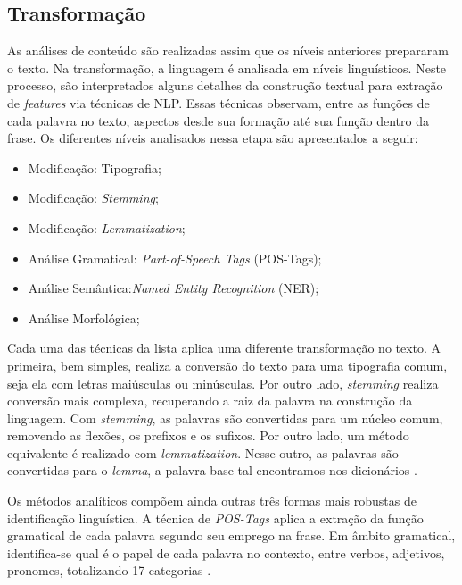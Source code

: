 \subsection{Transformação}
\label{subsec-transformacao}

As análises de conteúdo são realizadas assim que os níveis anteriores prepararam o texto. Na transformação, a linguagem é analisada em níveis linguísticos. Neste processo, são interpretados alguns detalhes da construção textual para extração de \textit{features} via técnicas de NLP. Essas técnicas observam, entre as funções de cada palavra no texto, aspectos desde sua formação até sua função dentro da frase. Os diferentes níveis analisados nessa etapa são apresentados a seguir:

\begin{itemize}
	\item Modificação: Tipografia;
	\item Modificação: \textit{Stemming};
	\item Modificação: \textit{Lemmatization};
	\item Análise Gramatical: \textit{Part-of-Speech Tags} (POS-Tags);
	\item Análise Semântica:\textit{Named Entity Recognition} (NER);
	\item Análise Morfológica;
\end{itemize}

Cada uma das técnicas da lista aplica uma diferente transformação no texto. A primeira, bem simples, realiza a conversão do texto para uma tipografia comum, seja ela com letras maiúsculas ou minúsculas. Por outro lado, \textit{stemming} realiza conversão mais complexa, recuperando a raiz da palavra na construção da linguagem. Com \textit{stemming}, as palavras são convertidas para um núcleo comum, removendo as flexões, os prefixos e os sufixos. Por outro lado, um método equivalente é realizado com \textit{lemmatization}. Nesse outro, as palavras são convertidas para o \textit{lemma}, a palavra base tal encontramos nos dicionários \cite{baeza2011}. 

Os métodos analíticos compõem ainda outras três formas mais robustas de identificação linguística. A técnica de \textit{POS-Tags} aplica a extração da função gramatical de cada palavra segundo seu emprego na frase. Em âmbito gramatical, identifica-se qual é o papel de cada palavra no contexto, entre verbos, adjetivos, pronomes, totalizando 17 categorias \cite{marneffe2021}.

